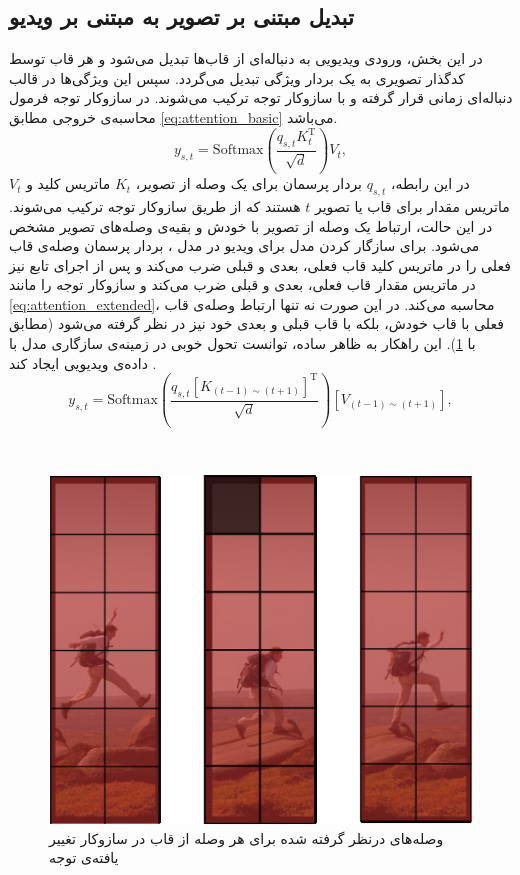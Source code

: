 \subsection{تبدیل  مبتنی بر تصویر به  مبتنی بر ویدیو}
در این بخش، ورودی ویدیویی به دنباله‌ای از قاب‌‌ها تبدیل می‌شود و هر قاب توسط کدگذار تصویری  به یک بردار ویژگی تبدیل می‌گردد. سپس این ویژگی‌ها در قالب دنباله‌ای زمانی قرار گرفته و با سازوکار توجه ترکیب می‌شوند. در سازوکار توجه فرمول محاسبه‌ی خروجی مطابق \eqref{eq:attention_basic} می‌باشد.
\begin{equation}\label{eq:attention_basic}
	y_{s,t} = \mathrm{Softmax}\left( \frac{q_{s,t} K_{t}^{\mathrm{T}}}{\sqrt{d}} \right) V_{t},
\end{equation}
در این رابطه، $q_{s,t}$ بردار پرسمان  برای یک وصله
	 از تصویر، $K_t$ ماتریس کلید و $V_t$ ماتریس مقدار برای قاب یا تصویر $t$ هستند که از طریق سازوکار توجه ترکیب می‌شوند. در این حالت، ارتباط یک وصله از تصویر با خودش و بقیه‌ی وصله‌های تصویر مشخص می‌شود. برای سازگار کردن مدل برای ویدیو در مدل ، بردار پرسمان وصله‌ی قاب فعلی را در ماتریس کلید قاب فعلی، بعدی و قبلی ضرب می‌کند و پس از اجرای تابع  نیز در ماتریس مقدار قاب فعلی، بعدی و قبلی ضرب می‌کند و سازوکار توجه را مانند \eqref{eq:attention_extended}، محاسبه می‌کند. در این صورت نه تنها ارتباط وصله‌ی قاب فعلی با قاب خودش، بلکه با قاب قبلی و بعدی خود نیز در نظر گرفته می‌شود (مطابق با \cref{fig.31}). این راهکار به ظاهر ساده، توانست تحول خوبی در زمینه‌ی سازگاری مدل  با داده‌ی ویدیویی ایجاد کند \cite{open-vclip}.
\begin{equation}\label{eq:attention_extended}
	y_{s,t} = \mathrm{Softmax}\left( 
	\frac{q_{s,t} \left[ K_{(t-1)\sim(t+1)} \right]^{\mathrm{T}}}{\sqrt{d}} 
	\right) 
	\left[ V_{(t-1)\sim(t+1)} \right],
\end{equation}

‌\begin{figure}
	\centering\includegraphics[scale=.50]{Images/Chapter3/openvclip_attention.png}
	\caption[]{ وصله‌های درنظر گرفته شده برای هر وصله از قاب در سازوکار تغییر یافته‌ی توجه}
	\label{fig.31}
\end{figure}

